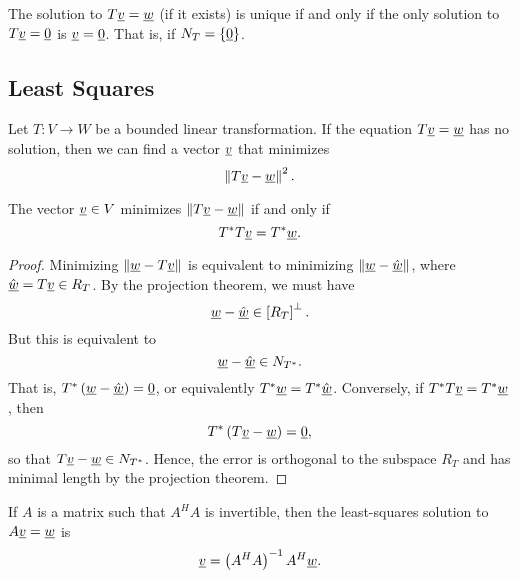 \begin{fact}
The solution to $T \underline{v} = \underline{w}$ (if it exists) is unique if and only if the only solution to $T \underline{v} = \underline{0}$ is $\underline{v} = \underline{0}$.
That is, if $N_T = \left\{ \underline{0} \right\}$.
\end{fact}

\subsection{Least Squares}

Let $T \colon V \rightarrow W$ be a bounded linear transformation.
If the equation $T \underline{v} = \underline{w}$ has no solution, then we can find a vector $\underline{v}$ that minimizes
\begin{equation*}
\left\| T \underline{v} - \underline{w} \right\|^2.
\end{equation*}

\begin{theorem}
The vector $\underline{v} \in V$ minimizes $\left\| T \underline{v} - \underline{w} \right\|$ if and only if
\begin{equation*}
T^* T \underline{v} = T^* \underline{w} .
\end{equation*}
\end{theorem}
\begin{proof}
Minimizing $\left\| \underline{w} - T \underline{v} \right\|$ is equivalent to minimizing $\left\| \underline{w} - \hat{\underline{w}} \right\|$, where $\hat{\underline{w}} = T\underline{v} \in R_T$.
By the projection theorem, we must have
\begin{equation*}
\underline{w} - \hat{\underline{w}} \in \left[ R_T \right]^{\bot} .
\end{equation*}
But this is equivalent to
\begin{equation*}
\underline{w} - \hat{\underline{w}} \in N_{T^*} .
\end{equation*}
That is, $T^* \left( \underline{w} - \hat{\underline{w}} \right) = \underline{0}$, or equivalently $T^* \underline{w} = T^* \hat{\underline{w}}$.
Conversely, if $T^*T \underline{v} = T^* \underline{w}$, then
\begin{equation*}
T^* \left( T \underline{v} - \underline{w} \right) = \underline{0},
\end{equation*}
so that $T \underline{v} - \underline{w} \in N_{T^*}$.
Hence, the error is orthogonal to the subspace $R_T$ and has minimal length by the projection theorem.
\end{proof}

\begin{corollary}
If $A$ is a matrix such that $A^H A$ is invertible, then the least-squares solution to $A \underline{v} = \underline{w}$ is
\begin{equation*}
\underline{v} = \left( A^H A \right)^{-1} A^H \underline{w}.
\end{equation*}
\end{corollary}

